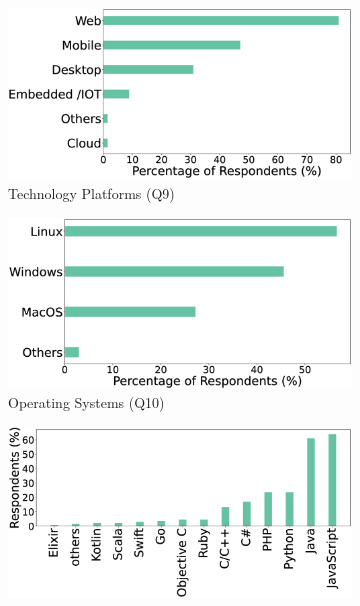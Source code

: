 \begin{figure}[t]
    \centering
    \caption{Software development tools and techniques used by the respondents}
    \begin{subfigure}{0.45\textwidth}
        \includegraphics[scale=0.1]{Figures/Respondents_Technologies}
        \caption{Technology Platforms (Q9)}
        \label{fig:platforms}
    \end{subfigure}
    \begin{subfigure}{0.45\textwidth}
          \includegraphics[scale=0.1]{Figures/Respondents_os}
          \caption{Operating Systems (Q10)}
          \label{fig:os}
    \end{subfigure}
    \begin{subfigure}{0.45\textwidth}
          \includegraphics[scale=0.10]{Figures/Respondents_languages}

\end{subfigure}
\end{figure}
